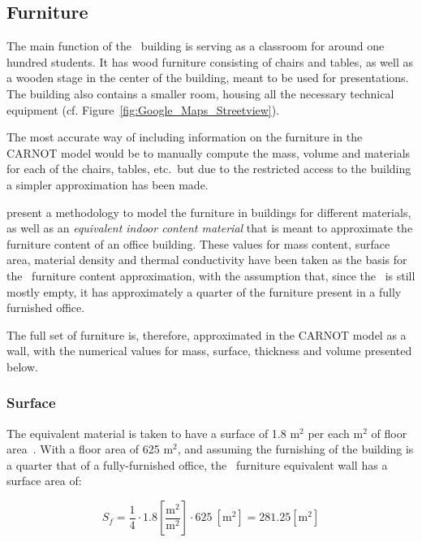 \subsection{Furniture}

The main function of the \pdome\ building is serving as a classroom for around
one hundred students. It has wood furniture consisting of chairs and tables, as
well as a wooden stage in the center of the building, meant to be used for
presentations. The building also contains a smaller room, housing all the
necessary technical equipment (cf. Figure~\ref{fig:Google_Maps_Streetview}).

The most accurate way of including information on the furniture in the CARNOT
model would be to manually compute the mass, volume and materials for each of
the chairs, tables, etc.\ but due to the restricted access to the building a
simpler approximation has been made.

\textcite{johraNumericalAnalysisImpact2017} present a methodology to model the
furniture in buildings for different materials, as well as an \textit{equivalent
indoor content material} that is meant to approximate the furniture content of
an office building. These values for mass content, surface area, material
density and thermal conductivity have been taken as the basis for the \pdome\
furniture content approximation, with the assumption that, since the \pdome\ is
still mostly empty, it has approximately a quarter of the furniture present in a
fully furnished office.

The full set of furniture is, therefore, approximated in the CARNOT model as a
wall, with the numerical values for mass, surface, thickness and volume
presented below.

\subsubsection*{Surface}

The equivalent material is taken to have a surface of 1.8 $\text{m}^2$ per each
$\text{m}^2$ of floor area~\cite{johraNumericalAnalysisImpact2017}. With a floor
area of 625 $\text{m}^2$, and assuming the furnishing of the building is a
quarter that of a fully-furnished office, the \pdome\ furniture equivalent wall
has a surface area of:

\begin{equation}
    S_f = \frac{1}{4} \cdot 1.8 \left[\frac{\text{m}^2}{\text{m}^2}\right]
    \cdot 625\ \left[\text{m}^2\right] = 281.25 \left[\text{m}^2\right]
\end{equation}

